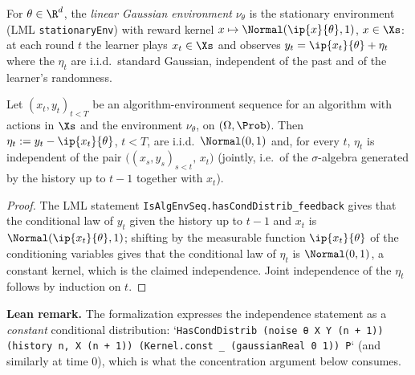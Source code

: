 \begin{definition}\label{def:env}
\leanok
{}
For $\theta \in \R^d$, the \emph{linear Gaussian environment} $\nu_\theta$ is the stationary
environment (LML \texttt{stationaryEnv}) with reward kernel
$x \mapsto \Normal(\ip{x}{\theta}, 1)$, $x \in \Xs$: at each round $t$ the learner plays
$x_t \in \Xs$ and observes $y_t = \ip{x_t}{\theta} + \eta_t$ where the $\eta_t$ are i.i.d.\
standard Gaussian, independent of the past and of the learner's randomness.
\end{definition}

\begin{lemma}[Noise representation]\label{lem:noise_representation}
\leanok
\uses{def:env}
Let $(x_t, y_t)_{t < T}$ be an algorithm-environment sequence for an algorithm with actions
in $\Xs$ and the environment $\nu_\theta$, on $(\Omega, \Prob)$. Then
$\eta_t := y_t - \ip{x_t}{\theta}$, $t < T$, are i.i.d.\ $\Normal(0,1)$ and, for every $t$,
$\eta_t$ is independent of the pair $\big((x_s, y_s)_{s < t},\, x_t\big)$ (jointly, i.e.\ of the
$\sigma$-algebra generated by the history up to $t-1$ together with $x_t$).
\end{lemma}

\begin{proof}
\leanok
{}
The LML statement \texttt{IsAlgEnvSeq.hasCondDistrib\_feedback} gives that the conditional law
of $y_t$ given the history up to $t-1$ and $x_t$ is $\Normal(\ip{x_t}{\theta},1)$; shifting by
the measurable function $\ip{x_t}{\theta}$ of the conditioning variables gives that the
conditional law of $\eta_t$ is $\Normal(0,1)$, a constant kernel, which is the claimed
independence. Joint independence of the $\eta_t$ follows by induction on $t$.
\end{proof}

\textbf{Lean remark.} The formalization expresses the independence statement as a
\emph{constant} conditional distribution: `\texttt{HasCondDistrib (noise θ X Y (n + 1))
(history n, X (n + 1)) (Kernel.const \_ (gaussianReal 0 1)) P}` (and similarly at time $0$),
which is what the concentration argument below consumes.

